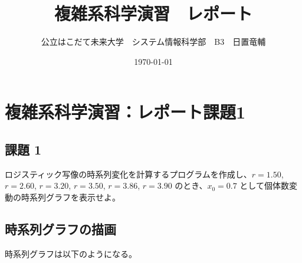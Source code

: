 \documentclass[dvipdfmx,uplatex]{jsarticle}
\title{複雑系科学演習　レポート}
\author{公立はこだて未来大学　システム情報科学部　B3　日置竜輔}
\date{\today}
\begin{document}
\maketitle
\tableofcontents %

\newpage

\section{複雑系科学演習：レポート課題1}

\subsection{課題 1}
  ロジスティック写像の時系列変化を計算するプログラムを作成し、$r = 1.50$, $r = 2.60$, $r = 3.20$, $r = 3.50$, $r = 3.86$, $r = 3.90$ のとき、$x_{0} = 0.7$ として個体数変動の時系列グラフを表示せよ。\\

\subsection{時系列グラフの描画}

時系列グラフは以下のようになる。
\end{document}
